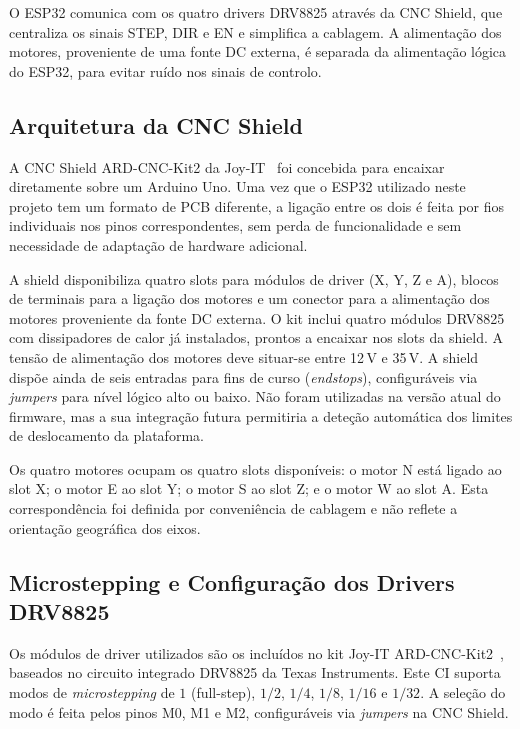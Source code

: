 O ESP32 comunica com os quatro drivers DRV8825 através da CNC Shield, que centraliza os sinais STEP, DIR e EN e simplifica a cablagem. A alimentação dos motores, proveniente de uma fonte DC externa, é separada da alimentação lógica do ESP32, para evitar ruído nos sinais de controlo.


\subsection{Arquitetura da CNC Shield}
\label{subsec:arquitetura-cnc}

A CNC Shield ARD-CNC-Kit2 da Joy-IT~\cite{JoyITCNCKit2} foi concebida para encaixar diretamente sobre um Arduino Uno. Uma vez que o ESP32 utilizado neste projeto tem um formato de PCB diferente, a ligação entre os dois é feita por fios individuais nos pinos correspondentes, sem perda de funcionalidade e sem necessidade de adaptação de hardware adicional.

A shield disponibiliza quatro slots para módulos de driver (X, Y, Z e A), blocos de terminais para a ligação dos motores e um conector para a alimentação dos motores proveniente da fonte DC externa. O kit inclui quatro módulos DRV8825 com dissipadores de calor já instalados, prontos a encaixar nos slots da shield. A tensão de alimentação dos motores deve situar-se entre 12\,V e 35\,V. A shield dispõe ainda de seis entradas para fins de curso (\textit{endstops}), configuráveis via \textit{jumpers} para nível lógico alto ou baixo. Não foram utilizadas na versão atual do firmware, mas a sua integração futura permitiria a deteção automática dos limites de deslocamento da plataforma.

Os quatro motores ocupam os quatro slots disponíveis: o motor N está ligado ao slot X; o motor E ao slot Y; o motor S ao slot Z; e o motor W ao slot A. Esta correspondência foi definida por conveniência de cablagem e não reflete a orientação geográfica dos eixos.


\subsection{Microstepping e Configuração dos Drivers DRV8825}
\label{subsec:microstepping}

Os módulos de driver utilizados são os incluídos no kit Joy-IT ARD-CNC-Kit2~\cite{JoyITCNCKit2}, baseados no circuito integrado DRV8825 da Texas Instruments. Este CI suporta modos de \textit{microstepping} de $1$ (full-step), $1/2$, $1/4$, $1/8$, $1/16$ e $1/32$. A seleção do modo é feita pelos pinos M0, M1 e M2, configuráveis via \textit{jumpers} na CNC Shield.

